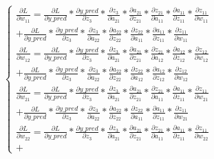 \documentclass[12pt,a4paper]{article}
\begin{document}
\begin{eqnarray}
  \left\{
  \begin{aligned}
    \frac{\partial L}{\partial w_\text{11}} = \frac{\partial L}{\partial y\_pred} * \frac{\partial y\_pred}{\partial z_3} * \frac{\partial z_3}{\partial a_\text{21}} * \frac{\partial a_\text{21}}{\partial z_\text{21}} * \frac{\partial z_\text{21}}{\partial a_\text{11}} * \frac{\partial a_\text{11}}{\partial z_\text{11}} * \frac{\partial z_\text{11}}{\partial w_\text{11}} \\ + 
      \frac{\partial L}{\partial y\_pred} * \frac{\partial y\_pred}{\partial z_3} * \frac{\partial z_3}{\partial a_\text{22}} * \frac{\partial a_\text{22}}{\partial z_\text{22}} * \frac{\partial z_\text{22}}{\partial a_\text{11}} * \frac{\partial a_\text{11}}{\partial z_\text{11}} * \frac{\partial z_\text{11}}{\partial w_\text{11}} \\
    \frac{\partial L}{\partial w_\text{12}} = \frac{\partial L}{\partial y\_pred} * \frac{\partial y\_pred}{\partial z_3} * \frac{\partial z_3}{\partial a_\text{21}} * \frac{\partial a_\text{21}}{\partial z_\text{21}} * \frac{\partial z_\text{21}}{\partial a_\text{12}} * \frac{\partial a_\text{12}}{\partial z_\text{12}} * \frac{\partial z_\text{12}}{\partial w_\text{12}} \\ + 
      \frac{\partial L}{\partial y\_pred} * \frac{\partial y\_pred}{\partial z_3} * \frac{\partial z_3}{\partial a_\text{22}} * \frac{\partial a_\text{22}}{\partial z_\text{22}} * \frac{\partial z_\text{22}}{\partial a_\text{12}} * \frac{\partial a_\text{12}}{\partial z_\text{12}} * \frac{\partial z_\text{12}}{\partial w_\text{12}} \\
    \frac{\partial L}{\partial w_\text{21}} = \frac{\partial L}{\partial y\_pred} * \frac{\partial y\_pred}{\partial z_3} * \frac{\partial z_3}{\partial a_\text{21}} * \frac{\partial a_\text{21}}{\partial z_\text{21}} * \frac{\partial z_\text{21}}{\partial a_\text{11}} * \frac{\partial a_\text{11}}{\partial z_\text{11}} * \frac{\partial z_\text{11}}{\partial w_\text{21}} \\ + 
      \frac{\partial L}{\partial y\_pred} * \frac{\partial y\_pred}{\partial z_3} * \frac{\partial z_3}{\partial a_\text{22}} * \frac{\partial a_\text{22}}{\partial z_\text{22}} * \frac{\partial z_\text{22}}{\partial a_\text{11}} * \frac{\partial a_\text{11}}{\partial z_\text{11}} * \frac{\partial z_\text{11}}{\partial w_\text{21}} \\
    \frac{\partial L}{\partial w_\text{22}} = \frac{\partial L}{\partial y\_pred} * \frac{\partial y\_pred}{\partial z_3} * \frac{\partial z_3}{\partial a_\text{21}} * \frac{\partial a_\text{21}}{\partial z_\text{21}} * \frac{\partial z_\text{21}}{\partial a_\text{11}} * \frac{\partial a_\text{11}}{\partial z_\text{11}} * \frac{\partial z_\text{11}}{\partial w_\text{22}} \\ + 

\end{aligned}
\end{eqnarray}
\end{document}

